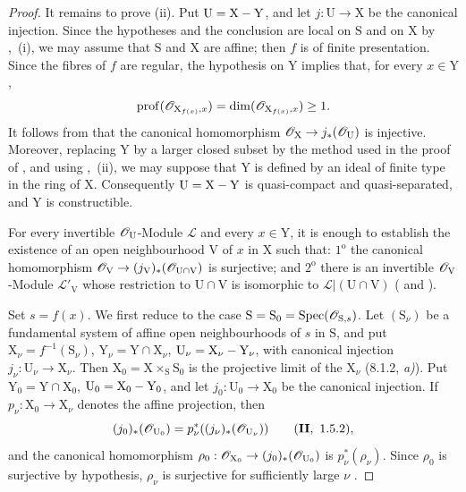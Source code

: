 \begin{proof}
It remains to prove (ii). Put $\mathrm{U}=\mathrm{X}-\mathrm{Y}$, and let $j:\mathrm{U}\to\mathrm{X}$ be the canonical injection. Since the hypotheses and the conclusion are local on $\mathrm{S}$ and on $\mathrm{X}$ by ,~(i), we may assume that $\mathrm{S}$ and $\mathrm{X}$ are affine; then $f$ is of finite presentation. Since the fibres of $f$ are regular, the hypothesis on $\mathrm{Y}$ implies that, for every $x\in\mathrm{Y}$,
\[
  \operatorname{prof}(\mathscr{O}_{\mathrm{X}_{f(x)},x})
  =\dim(\mathscr{O}_{\mathrm{X}_{f(x)},x})\geq1.
\]
It follows from  that the canonical homomorphism $\mathscr{O}_{\mathrm{X}}\to j_*(\mathscr{O}_{\mathrm{U}})$ is injective. Moreover, replacing $\mathrm{Y}$ by a larger closed subset by the method used in the proof of , and using ,~(ii), we may suppose that $\mathrm{Y}$ is defined by an ideal of finite type in the ring of $\mathrm{X}$. Consequently $\mathrm{U}=\mathrm{X}-\mathrm{Y}$ is quasi-compact and quasi-separated, and $\mathrm{Y}$ is constructible.

For every invertible $\mathscr{O}_{\mathrm{U}}$-Module $\mathscr{L}$ and every $x\in\mathrm{Y}$, it is enough to establish the existence of an open neighbourhood $\mathrm{V}$ of $x$ in $\mathrm{X}$ such that: $1^{\mathrm{o}}$ the canonical homomorphism $\mathscr{O}_{\mathrm{V}}\to(j_{\mathrm{V}})_*(\mathscr{O}_{\mathrm{U}\cap\mathrm{V}})$ is surjective; and $2^{\mathrm{o}}$ there is an invertible $\mathscr{O}_{\mathrm{V}}$-Module $\mathscr{L}'_{\mathrm{V}}$ whose restriction to $\mathrm{U}\cap\mathrm{V}$ is isomorphic to $\mathscr{L}|(\mathrm{U}\cap\mathrm{V})$ ( and ).

Set $s=f(x)$. We first reduce to the case $\mathrm{S}=\mathrm{S}_0=\operatorname{Spec}(\mathscr{O}_{\mathrm{S},s})$. Let $(\mathrm{S}_\nu)$ be a fundamental system of affine open neighbourhoods of $s$ in $\mathrm{S}$, and put $\mathrm{X}_\nu=f^{-1}(\mathrm{S}_\nu)$, $\mathrm{Y}_\nu=\mathrm{Y}\cap\mathrm{X}_\nu$, $\mathrm{U}_\nu=\mathrm{X}_\nu-\mathrm{Y}_\nu$, with canonical injection $j_\nu:\mathrm{U}_\nu\to\mathrm{X}_\nu$. Then $\mathrm{X}_0=\mathrm{X}\times_{\mathrm{S}}\mathrm{S}_0$ is the projective limit of the $\mathrm{X}_\nu$ (8.1.2, \emph{a)}). Put $\mathrm{Y}_0=\mathrm{Y}\cap\mathrm{X}_0$, $\mathrm{U}_0=\mathrm{X}_0-\mathrm{Y}_0$, and let $j_0:\mathrm{U}_0\to\mathrm{X}_0$ be the canonical injection. If $p_\nu:\mathrm{X}_0\to\mathrm{X}_\nu$ denotes the affine projection, then
\[
  (j_0)_*(\mathscr{O}_{\mathrm{U}_0})
  =p_\nu^*((j_\nu)_*(\mathscr{O}_{\mathrm{U}_\nu}))
  \qquad (\mathbf{II},\ 1.5.2),
\]
and the canonical homomorphism $\rho_0:\mathscr{O}_{\mathrm{X}_0}\to(j_0)_*(\mathscr{O}_{\mathrm{U}_0})$ is $p_\nu^*(\rho_\nu)$. Since $\rho_0$ is surjective by hypothesis, $\rho_\nu$ is surjective for sufficiently large $\nu$ .


\end{proof}
